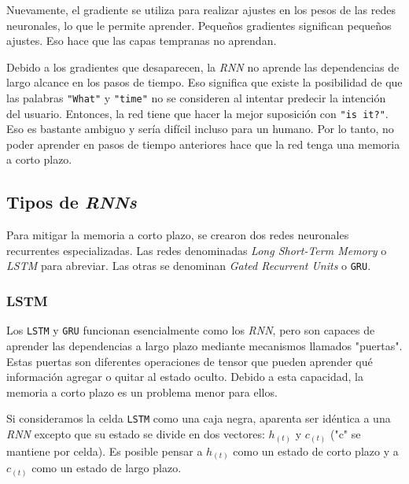 \documentclass[a4paper,12pt]{article}
\begin{document}
Nuevamente, el gradiente se utiliza para realizar ajustes en los pesos de las redes neuronales, lo que le permite aprender. Pequeños gradientes significan pequeños ajustes. Eso hace que las capas tempranas no aprendan.

Debido a los gradientes que desaparecen, la \textit{RNN} no aprende las dependencias de largo alcance en los pasos de tiempo. Eso significa que existe la posibilidad de que las palabras \texttt{"What"} y \texttt{"time"} no se consideren al intentar predecir la intención del usuario. Entonces, la red tiene que hacer la mejor suposición con \texttt{"is it?"}. Eso es bastante ambiguo y sería difícil incluso para un humano. Por lo tanto, no poder aprender en pasos de tiempo anteriores hace que la red tenga una memoria a corto plazo.

\subsection{Tipos de \textit{RNNs}}
Para mitigar la memoria a corto plazo, se crearon dos redes neuronales recurrentes especializadas. Las redes denominadas \textit{Long Short-Term Memory} o \textit{LSTM} para abreviar. Las otras se denominan \textit{Gated Recurrent Units} o \texttt{GRU}.

\subsubsection{LSTM}
Los \texttt{LSTM} y \texttt{GRU} funcionan esencialmente como los \textit{RNN}, pero son capaces de aprender las dependencias a largo plazo mediante mecanismos llamados "puertas". Estas puertas son diferentes operaciones de tensor que pueden aprender qué información agregar o quitar al estado oculto. Debido a esta capacidad, la memoria a corto plazo es un problema menor para ellos. \citep{olahlstm}

Si consideramos la celda \texttt{LSTM} como una caja negra, aparenta ser idéntica a una \textit{RNN} excepto que su estado se divide en dos vectores: $h_{(t)}$ y $c_{(t)}$ ("c" se mantiene por celda). Es posible pensar a $h_{(t)}$ como un estado de corto plazo y a $c_{(t)}$ como un estado de largo plazo.
\end{document}
